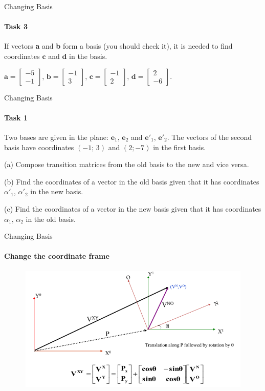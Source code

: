 \documentclass[aspectratio=169,notes]{beamer}
\begin{document}
\begin{frame}[t]{Changing Basis}
    \framesubtitle{Task 3}
    If vectors \textbf{a} and \textbf{b} form a basis (you should check it), it is needed to find coordinates $\textbf{c}$ and $\textbf{d}$ in the basis.\medskip
    
    $\textbf{a}=\begin{bmatrix} -5 \\ -1 \end{bmatrix}$, $\textbf{b}=\begin{bmatrix} -1 \\ 3\end{bmatrix}$, 
    $\textbf{c}=\begin{bmatrix} -1 \\ 2 \end{bmatrix}$, 
    $\textbf{d}=\begin{bmatrix} 2 \\ -6\end{bmatrix}$.
    \end{frame}

\begin{frame}[t]{Changing Basis}
    \framesubtitle{Task 1}
    Two bases are given in the plane: $\textbf{e}_1$, $\textbf{e}_2$ and $\textbf{e}'_1$, $\textbf{e}'_2$. The vectors of the second basis have coordinates $(-1;\,3)$ and $(2;-7)$ in the first basis.
    
    (a) Compose transition matrices from the old basis to the new and vice versa.
    
    (b) Find the coordinates of a vector in the old basis given that it has coordinates $\alpha'_1$, $\alpha'_2$ in the new basis.
    
    (c) Find the coordinates of a vector in the new basis given that it has coordinates $\alpha_1$, $\alpha_2$ in the old basis.
    \end{frame}

\begin{frame}[t]{Changing Basis}
\framesubtitle{Change the coordinate frame}
\vspace{-0.6cm}
    \begin{figure}[H]
        \centering\includegraphics[height=6cm,width=1\textwidth,keepaspectratio]{change_klimchik_1.png}
        \label{fig:change_klimchik_1.png}
    \end{figure}
\end{frame}
\end{document}
